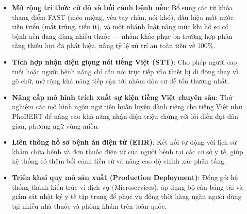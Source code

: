 \begin{itemize}[leftmargin=1.6em, itemsep=2pt]
  \item \textbf{Mở rộng tri thức cờ đỏ và bối cảnh bệnh nền}: Bổ sung các từ khóa
        thang điểm FAST (méo miệng, yếu tay chân, nói khó), dấu hiệu mất nước
        tiến triển (mắt trũng, tiểu ít), và một nhánh luật nâng mức khi hồ sơ có
        bệnh nền đang dùng nhiều thuốc — nhằm khắc phục ba trường hợp phân tầng
        thiếu hụt đã phát hiện, nâng tỷ lệ xử trí an toàn tiến về 100\%.
  \item \textbf{Tích hợp nhận diện giọng nói tiếng Việt (STT)}: Cho phép người
        cao tuổi hoặc người bệnh nặng chỉ cần nói trực tiếp vào thiết bị di động
        thay vì gõ chữ, mở rộng khả năng tiếp cận tới nhóm dân cư dễ tổn thương nhất.
  \item \textbf{Nâng cấp mô hình trích xuất sự kiện tiếng Việt chuyên sâu}: Thử
        nghiệm các mô hình ngôn ngữ tiền huấn luyện dành riêng cho tiếng Việt
        như PhoBERT \cite{Nguyen2020} để nâng cao khả năng nhận diện triệu chứng
        với lối diễn đạt dân gian, phương ngữ vùng miền.
  \item \textbf{Liên thông hồ sơ bệnh án điện tử (EHR)}: Kết nối tự động với lịch
        sử khám chữa bệnh và đơn thuốc điện tử của người bệnh tại các cơ sở y tế,
        giúp hệ thống có thêm bối cảnh tiền sử và nâng cao độ chính xác phân tầng.
  \item \textbf{Triển khai quy mô sản xuất (Production Deployment)}: Đóng gói hệ
        thống thành kiến trúc vi dịch vụ (Microservices), áp dụng bộ cân bằng tải
        và giám sát nhật ký y tế tập trung để phục vụ đồng thời hàng ngàn người
        dùng tại nhiều nhà thuốc và phòng khám trên toàn quốc.
\end{itemize}
